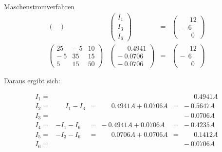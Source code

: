 \begin{example}{Maschenstromverfahren}
\[\begin{array}{cccc}
\begin{pmatrix}
            \end{pmatrix}
              &
            \begin{pmatrix}
                I_1 \\
                I_3 \\
                I_6
            \end{pmatrix}
              & = &
            \begin{pmatrix}
                \phantom{-} \ 12 \\
                - \ \ 6          \\
                \phantom{-} \ \ 0
            \end{pmatrix}     \\
            \begin{pmatrix}
                25    & - \ 5 & 10 \\
                - \ 5 & 35    & 15 \\
                5     & 15    & 50
            \end{pmatrix}
              &
            \begin{pmatrix}
                \phantom{-} \ 0.4941 \\
                - \ 0.0706           \\
                - \ 0.0706
            \end{pmatrix}
              & = &
            \begin{pmatrix}
                \phantom{-} \ 12 \\
                - \ \ 6          \\
                \phantom{-} \ \ 0
            \end{pmatrix}
        \end{array}
    \]

    Daraus ergibt sich:

    \[
        \begin{matrix}
            I_1 = &                         &   &                                   &   & \phantom{-} \ 0.4941 A \\
            I_2 = & \phantom{-} \ I_1 - I_3 & = & \phantom{-} \ 0.4941 A + 0.0706 A & = & - \ 0.5647 A           \\
            I_3 = &                         &   &                                   &   & - \ 0.0706 A           \\
            I_4 = & - I_1 - I_6             & = & - \ 0.4941 A + 0.0706 A           & = & - \ 0.4235 A           \\
            I_5 = & - I_3 - I_6             & = & \phantom{-} \ 0.0706 A + 0.0706 A & = & \phantom{-} \ 0.1412 A \\
            I_6 = &                         &   &                                   &   & - \ 0.0706 A           \\
        \end{matrix}
    \]
\end{example}